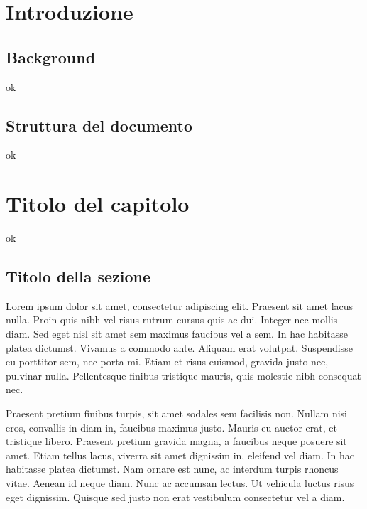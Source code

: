 \documentclass[12pt,a4paper,openright,twoside]{report}
\begin{document}
\clearpage{\pagestyle{empty}\cleardoublepage}
\tableofcontents
{}
\listoffigures
\clearpage{\pagestyle{empty}\cleardoublepage}
\listoftables
\clearpage{\pagestyle{empty}\cleardoublepage}

\clearpage{\pagestyle{empty}\cleardoublepage}
\chapter{Introduzione}
\lhead[\fancyplain{}{\bfseries\thepage}]{\fancyplain{}{\bfseries\rightmark}}

\section{Background}
ok
\section{Struttura del documento}
ok

\chapter{Titolo del capitolo}
\lhead[\fancyplain{}{\bfseries\thepage}]{\fancyplain{}{\bfseries\rightmark}}
ok

\section{Titolo della sezione}
\label{chap:physical_memory}
Lorem ipsum dolor sit amet, consectetur adipiscing elit. Praesent sit amet lacus nulla. Proin quis nibh vel risus rutrum cursus quis ac dui. Integer nec mollis diam. Sed eget nisl sit amet sem maximus faucibus vel a sem. In hac habitasse platea dictumst. Vivamus a commodo ante. Aliquam erat volutpat. Suspendisse eu porttitor sem, nec porta mi. Etiam et risus euismod, gravida justo nec, pulvinar nulla. Pellentesque finibus tristique mauris, quis molestie nibh consequat nec.

Praesent pretium finibus turpis, sit amet sodales sem facilisis non. Nullam nisi eros, convallis in diam in, faucibus maximus justo. Mauris eu auctor erat, et tristique libero. Praesent pretium gravida magna, a faucibus neque posuere sit amet. Etiam tellus lacus, viverra sit amet dignissim in, eleifend vel diam. In hac habitasse platea dictumst. Nam ornare est nunc, ac interdum turpis rhoncus vitae. Aenean id neque diam. Nunc ac accumsan lectus. Ut vehicula luctus risus eget dignissim. Quisque sed justo non erat vestibulum consectetur vel a diam.
\end{document}
